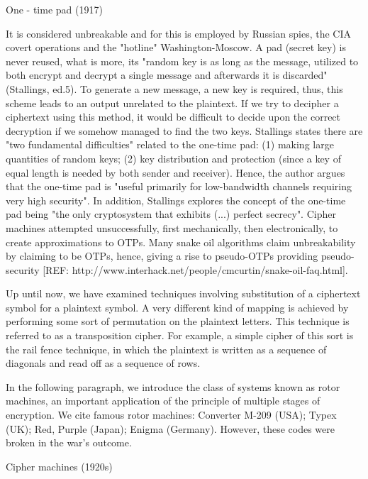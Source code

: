  One - time pad (1917)

It is considered unbreakable and for this is employed by Russian spies, the CIA covert operations and the "hotline" Washington-Moscow. A pad (secret key) is never reused, what is more,  its "random key is as long as the message, utilized to both encrypt and decrypt a single message and afterwards it is discarded"(Stallings, ed.5). To generate a new message, a new key is required, thus, this scheme leads to an output unrelated to the plaintext. If we try to decipher a ciphertext using this method, it would be difficult to decide upon the correct decryption if we somehow managed to find the two keys. Stallings states there are "two fundamental difficulties" related to the one-time pad: (1) making large quantities of random keys; (2) key distribution and protection (since a key of equal length is needed by both sender and receiver). Hence, the author argues that the one-time pad is "useful primarily for low-bandwidth channels requiring very high security". In addition, Stallings explores the concept of the one-time pad being "the only cryptosystem that exhibits (...) perfect secrecy".
Cipher machines attempted unsuccessfully, first mechanically, then electronically, to create approximations to OTPs. Many snake oil algorithms claim unbreakability by claiming to be OTPs, hence, giving a rise to pseudo-OTPs providing pseudo-security [REF: http://www.interhack.net/people/cmcurtin/snake-oil-faq.html].


Up until now, we have examined techniques involving substitution of a ciphertext symbol for a plaintext symbol. A very different kind of mapping is achieved by performing some sort of permutation on the plaintext letters. This technique is referred to as a transposition cipher. For example, a simple cipher of this sort is the rail fence technique, in which the plaintext is written as a sequence of diagonals and read off as a sequence of rows.

In the following paragraph, we introduce the class of systems known as rotor machines, an important application of the principle of multiple stages of encryption. We cite famous rotor machines: Converter M-209 (USA); Typex (UK); Red, Purple (Japan); Enigma (Germany). However, these codes were broken in the war’s outcome. 

Cipher machines (1920s)

